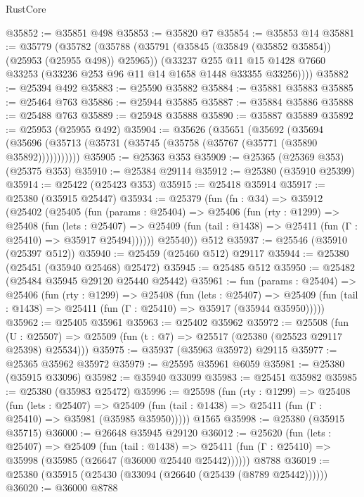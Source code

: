 \begin{lexlean}{RustCore}
\begin{coremodule}
@35852 := @35851 @498
@35853 := @35820 @7
@35854 := @35853 @14
@35881 := @35779
    (@35782
      (@35788
        (@35791 (@35845 (@35849 (@35852 @35854)) (@25953 (@25955 @498)) @25965))
        (@33237
          @255
          @11
          @15
          @1428
          @7660
          @33253
          (@33236 @253 @96 @11 @14 @1658 @1448 @33355 @33256))))
@35882 := @25394 @492
@35883 := @25590 @35882
@35884 := @35881 @35883
@35885 := @25464 @763
@35886 := @25944 @35885
@35887 := @35884 @35886
@35888 := @25488 @763
@35889 := @25948 @35888
@35890 := @35887 @35889
@35892 := @25953 (@25955 @492)
@35904 := @35626
    (@35651
      (@35692
        (@35694 (@35696 (@35713 (@35731 (@35745 (@35758 (@35767 (@35771 (@35890 @35892)))))))))))
@35905 := @25363 @353
@35909 := @25365 (@25369 @353) (@25375 @353)
@35910 := @25384 @29114
@35912 := @25380 (@35910 @25399)
@35914 := @25422 (@25423 @353)
@35915 := @25418 @35914
@35917 := @25380 (@35915 @25447)
@35934 := @25379
    (fun (fn : @34) =>
    @35912
      (@25402
        (@25405
          (fun (params : @25404) =>
          @25406
            (fun (rty : @1299) =>
            @25408
              (fun (lets : @25407) =>
              @25409 (fun (tail : @1438) => @25411 (fun (Γ : @25410) => @35917 @25494))))))
        @25540))
    @512
@35937 := @25546 (@35910 (@25397 @512))
@35940 := @25459 (@25460 @512) @29117
@35944 := @25380 (@25451 (@35940 @25468) @25472)
@35945 := @25485 @512
@35950 := @25482 (@25484 @35945 @29120 @25440 @25442)
@35961 := fun (params : @25404) =>
  @25406
    (fun (rty : @1299) =>
    @25408
      (fun (lets : @25407) =>
      @25409 (fun (tail : @1438) => @25411 (fun (Γ : @25410) => @35917 (@35944 @35950)))))
@35962 := @25405 @35961
@35963 := @25402 @35962
@35972 := @25508
    (fun (U : @25507) => @25509 (fun (t : @7) => @25517 (@25380 (@25523 @29117 @25398) @25534)))
@35975 := @35937 (@35963 @35972) @29115
@35977 := @25365 @35962 @35972
@35979 := @25595 @35961 @6059
@35981 := @25380 (@35915 @33096)
@35982 := @35940 @33099
@35983 := @25451 @35982
@35985 := @25380 (@35983 @25472)
@35996 := @25598
    (fun (rty : @1299) =>
    @25408
      (fun (lets : @25407) =>
      @25409 (fun (tail : @1438) => @25411 (fun (Γ : @25410) => @35981 (@35985 @35950)))))
    @1565
@35998 := @25380 (@35915 @35715)
@36000 := @26648 @35945 @29120
@36012 := @25620
    (fun (lets : @25407) =>
    @25409
      (fun (tail : @1438) =>
      @25411 (fun (Γ : @25410) => @35998 (@35985 (@26647 (@36000 @25440 @25442))))))
    @8788
@36019 := @25380 (@35915 (@25430 (@33094 (@26640 (@25439 (@8789 @25442))))))
@36020 := @36000 @8788

\end{coremodule}
\end{lexlean}
